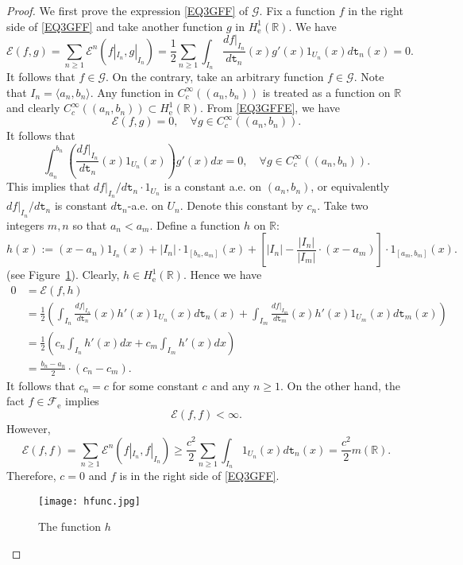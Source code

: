 \documentclass[a4paper]{amsart}
\theoremstyle{definition}
\theoremstyle{remark}
\numberwithin{equation}{section}
\begin{document}
\begin{proof}
We first prove the expression \eqref{EQ3GFF} of $\mathcal{G}$. Fix a function $f$ in the right side of \eqref{EQ3GFF} and take another function $g$ in $H^1_\mathrm{e}(\mathbb{R})$. We have
\[
	{{\mathcal{E}}}(f,g)=\sum_{n\geq 1}{{\mathcal{E}}}^n(f|_{I_n}, g|_{I_n})=\frac{1}{2}\sum_{n\geq 1} \int_{I_n}\frac{df|_{I_n}}{d{{\mathtt{t}}}_n}(x) g'(x)1_{U_n}(x)d{{\mathtt{t}}}_n(x)=0.
\]
It follows that $f\in \mathcal{G}$. On the contrary, take an arbitrary function $f\in \mathcal{G}$. Note that $I_n=\langle a_n, b_n\rangle$. Any function in $C_c^\infty((a_n,b_n))$ is treated as a function on $\mathbb{R}$ and clearly $C_c^\infty((a_n,b_n)) \subset H^1_\mathrm{e}(\mathbb{R})$. From \eqref{EQ3GFFE}, we have
\[
	{{\mathcal{E}}}(f,g)=0,\quad \forall g\in C_c^\infty((a_n, b_n)).
\]
It follows that
\[
\int_{a_n}^{b_n}\left(\frac{df|_{I_n}}{d{{\mathtt{t}}}_n}(x)1_{U_n}(x) \right)g'(x)dx=0,\quad \forall g\in C_c^\infty((a_n, b_n)).
\]
This implies that $df|_{I_n}/d{{\mathtt{t}}}_n\cdot 1_{U_n}$ is a constant a.e. on $(a_n,b_n)$, or equivalently $df|_{I_n}/d{{\mathtt{t}}}_n$ is constant $d{{\mathtt{t}}}_n$-a.e. on $U_n$. Denote this constant by $c_n$. Take two integers $m,n$ so that $a_n<a_m$. Define a function $h$ on $\mathbb{R}$:
$$h(x):= (x-a_n)1_{I_n}(x)+|I_n|\cdot 1_{[b_n,a_m]}(x)+\left[|I_n|-\frac{|I_n|}{|I_m|}\cdot (x-a_m)\right]\cdot
1_{[a_m, b_m]}(x).$$ (see Figure~\ref{FIG2}). Clearly, $h\in H^1_\mathrm{e}(\mathbb{R})$. Hence we have
\[
\begin{aligned}
0&={{\mathcal{E}}}(f,h) \\
&=\frac{1}{2}\left(\int_{I_n}\frac{df|_{I_n}}{d{{\mathtt{t}}}_n}(x)h'(x)1_{U_n}(x)d{{\mathtt{t}}}_n(x)+ \int_{I_m}\frac{df|_{I_m}}{d{{\mathtt{t}}}_m}(x)h'(x)1_{U_m}(x)d{{\mathtt{t}}}_m(x) \right) \\
&= \frac{1}{2}\left(c_n\int_{I_n}h'(x)dx+c_m\int_{I_m}h'(x)dx \right) \\
&=\frac{b_n-a_n}{2}\cdot (c_n-c_m).
\end{aligned}\]
It follows that $c_n=c$ for some constant $c$ and any $n\geq 1$. On the other hand, the fact $f\in {{\mathcal{F}}}_\mathrm{e}$ implies
\[
	{{\mathcal{E}}}(f,f)<\infty.
\]
However,
\[
	{{\mathcal{E}}}(f,f)=\sum_{n\geq 1}{{\mathcal{E}}}^n(f|_{I_n},f|_{I_n})\geq \frac{c^2}{2}\sum_{n\geq 1} \int_{I_n} 1_{U_n}(x)d{{\mathtt{t}}}_n(x)=\frac{c^2}{2}m(\mathbb{R}).
\]
Therefore, $c=0$ and $f$ is in the right side of \eqref{EQ3GFF}.

\begin{figure}
\texttt{[image: hfunc.jpg]}
\caption{The function $h$}\label{FIG2}
\end{figure}


\end{proof}
\end{document}
